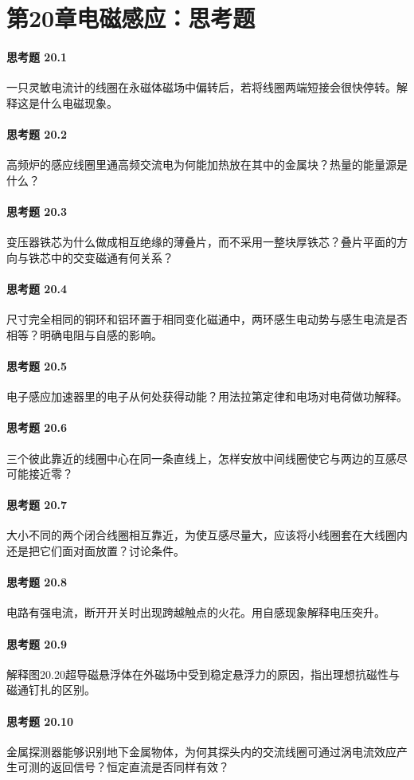\section*{第20章\quad 电磁感应：思考题}
\paragraph{思考题 20.1}
一只灵敏电流计的线圈在永磁体磁场中偏转后，若将线圈两端短接会很快停转。解释这是什么电磁现象。

\paragraph{思考题 20.2}
高频炉的感应线圈里通高频交流电为何能加热放在其中的金属块？热量的能量源是什么？

\paragraph{思考题 20.3}
变压器铁芯为什么做成相互绝缘的薄叠片，而不采用一整块厚铁芯？叠片平面的方向与铁芯中的交变磁通有何关系？

\paragraph{思考题 20.4}
尺寸完全相同的铜环和铝环置于相同变化磁通中，两环感生电动势与感生电流是否相等？明确电阻与自感的影响。

\paragraph{思考题 20.5}
电子感应加速器里的电子从何处获得动能？用法拉第定律和电场对电荷做功解释。

\paragraph{思考题 20.6}
三个彼此靠近的线圈中心在同一条直线上，怎样安放中间线圈使它与两边的互感尽可能接近零？

\paragraph{思考题 20.7}
大小不同的两个闭合线圈相互靠近，为使互感尽量大，应该将小线圈套在大线圈内还是把它们面对面放置？讨论条件。

\paragraph{思考题 20.8}
电路有强电流，断开开关时出现跨越触点的火花。用自感现象解释电压突升。

\paragraph{思考题 20.9}
解释图20.20超导磁悬浮体在外磁场中受到稳定悬浮力的原因，指出理想抗磁性与磁通钉扎的区别。

\paragraph{思考题 20.10}
金属探测器能够识别地下金属物体，为何其探头内的交流线圈可通过涡电流效应产生可测的返回信号？恒定直流是否同样有效？
